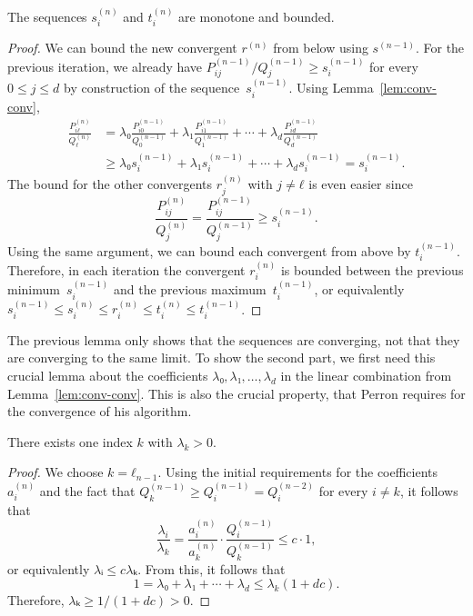 \begin{lemma}
  The sequences $s_i^{(n)}$ and $t_i^{(n)}$ are monotone and bounded.
\end{lemma}

\begin{proof}
  We can bound the new convergent $r^{(n)}$ from below using $s^{(n-1)}$.
  For the previous iteration, we already have $P_{ij}^{(n-1)}/Q_j^{(n-1)} ≥ s_i^{(n-1)}$
  for every $0 ≤ j ≤ d$ by construction of the sequence~$s_i^{(n-1)}$.
  Using Lemma~\ref{lem:conv-conv},
  \begin{align*}
    \frac{P_{iℓ}^{(n)}}{Q_{ℓ}^{(n)}}
    & = λ₀ \frac{P_{i0}^{(n-1)}}{Q_0^{(n-1)}} + λ₁ \frac{P_{i1}^{(n-1)}}{Q_1^{(n-1)}} + ⋯ + λ_d \frac{P_{id}^{(n-1)}}{Q_d^{(n-1)}} \\
    & ≥ λ₀ s_i^{(n-1)} + λ₁ s_i^{(n-1)} + ⋯ + λ_d s_i^{(n-1)} = s_i^{(n-1)}.
  \end{align*}
  The bound for the other convergents $r_j^{(n)}$ with $j ≠ ℓ$ is even easier since
  \[
    \frac{P_{ij}^{(n)}}{Q_j^{(n)}} = \frac{P_{ij}^{(n-1)}}{Q_j^{(n-1)}} ≥ s_i^{(n-1)}.
  \]
  Using the same argument, we can bound each convergent from above by $t_i^{(n-1)}$.
  Therefore, in each iteration the convergent $r_i^{(n)}$ is
  bounded between the previous minimum~$s_i^{(n-1)}$ and the previous maximum~$t_i^{(n-1)}$,
  or equivalently $s_i^{(n-1)} ≤ s_i^{(n)} ≤ r_i^{(n)} ≤ t_i^{(n)} ≤ t_i^{(n-1)}$.
\end{proof}

The previous lemma only shows that the sequences are converging,
not that they are converging to the same limit.
To show the second part, we first need this crucial lemma
about the coefficients $λ₀, λ₁, …, λ_d$ in the linear combination from Lemma~\ref{lem:conv-conv}.
This is also the crucial property, that Perron requires for the convergence of his algorithm.

\begin{lemma}
  \label{lem:lambda-pos}
  There exists one index $k$ with $λ_k > 0$.
\end{lemma}

\begin{proof}
  We choose $k = ℓ_{n-1}$.
  Using the initial requirements for the coefficients $a_i^{(n)}$ and the fact
  that $Q_k^{(n-1)} ≥ Q_i^{(n-1)} = Q_i^{(n-2)}$ for every $i ≠ k$,
  it follows that
  \[
    \frac{λ_i}{λ_k} = \frac{a_i^{(n)}}{a_k^{(n)}} · \frac{Q_i^{(n-1)}}{Q_k^{(n-1)}} ≤ c · 1,
  \]
  or equivalently $λᵢ ≤ c λₖ$. From this, it follows that
  \[
    1 = λ₀ + λ₁ + ⋯ + λ_d ≤ λ_k (1 + dc).
  \]
  Therefore, $λₖ ≥ 1/(1 + dc) > 0$.
\end{proof}

